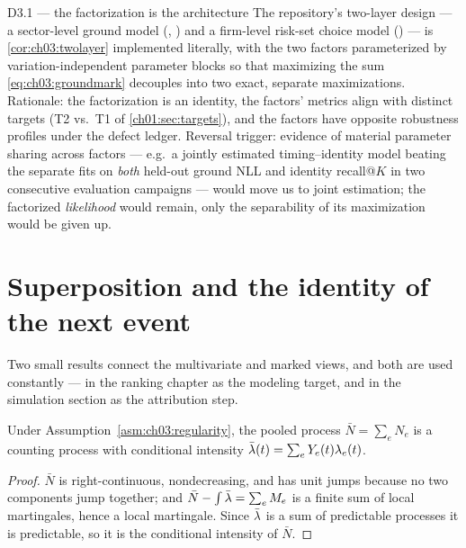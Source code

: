 \begin{decision}{D3.1 --- the factorization is the architecture}
The repository's two-layer design --- a sector-level ground model
(, ) and a firm-level
risk-set choice model () --- is
\cref{cor:ch03:twolayer} implemented literally, with the two factors
parameterized by variation-independent parameter blocks so that maximizing
the sum \cref{eq:ch03:groundmark} decouples into two exact, separate
maximizations. Rationale: the factorization is an identity, the factors'
metrics align with distinct targets (T2 vs.\ T1 of
\cref{ch01:sec:targets}), and the factors have opposite robustness
profiles under the defect ledger. Reversal trigger: evidence of material
parameter sharing across factors --- e.g.\ a jointly estimated timing--identity
model beating the separate fits on \emph{both} held-out ground NLL and
identity recall@$K$ in two consecutive evaluation campaigns --- would move
us to joint estimation; the factorized \emph{likelihood} would remain, only
the separability of its maximization would be given up.
\end{decision}

\section{Superposition and the identity of the next event}\label{ch03:sec:superposition}

Two small results connect the multivariate and marked views, and both are
used constantly --- in the ranking chapter as the modeling target, and in
the simulation section as the attribution step.

\begin{proposition}[Superposition]\label{prop:ch03:superposition}
Under Assumption~\ref{asm:ch03:regularity}, the pooled process
$\bar N = \sum_{e} N_e$ is a counting process with conditional intensity
$\bar{\lambda}(t) = \sum_e Y_e(t)\lambda_e(t)$.
\end{proposition}

\begin{proof}
$\bar N$ is right-continuous, nondecreasing, and has unit jumps because no
two components jump together; and $\bar N - \int \bar{\lambda}
= \sum_e M_e$ is a finite sum of local martingales, hence a local
martingale. Since $\bar{\lambda}$ is a sum of predictable processes it is
predictable, so it is the conditional intensity of $\bar N$.
\end{proof}

